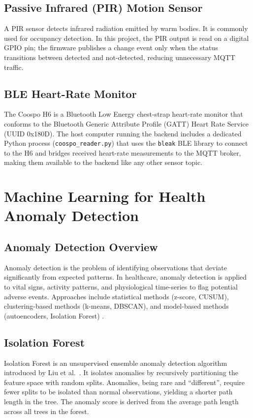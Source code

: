 \subsection{Passive Infrared (PIR) Motion Sensor}

A PIR sensor detects infrared radiation emitted by warm bodies. It is commonly used for occupancy detection. In this project, the PIR output is read on a digital GPIO pin; the firmware publishes a change event only when the status transitions between detected and not-detected, reducing unnecessary MQTT traffic.

\subsection{BLE Heart-Rate Monitor}

The Coospo H6 is a Bluetooth Low Energy chest-strap heart-rate monitor that conforms to the Bluetooth Generic Attribute Profile (GATT) Heart Rate Service (UUID 0x180D). The host computer running the backend includes a dedicated Python process (\texttt{coospo\_reader.py}) that uses the \texttt{bleak} BLE library to connect to the H6 and bridges received heart-rate measurements to the MQTT broker, making them available to the backend like any other sensor topic.

\section{Machine Learning for Health Anomaly Detection}

\subsection{Anomaly Detection Overview}

Anomaly detection is the problem of identifying observations that deviate significantly from expected patterns. In healthcare, anomaly detection is applied to vital signs, activity patterns, and physiological time-series to flag potential adverse events. Approaches include statistical methods (z-score, CUSUM), clustering-based methods (k-means, DBSCAN), and model-based methods (autoencoders, Isolation Forest) \cite{Chandola2009}.

\subsection{Isolation Forest}

Isolation Forest is an unsupervised ensemble anomaly detection algorithm introduced by Liu et al.\ \cite{Liu2008}. It isolates anomalies by recursively partitioning the feature space with random splits. Anomalies, being rare and ``different'', require fewer splits to be isolated than normal observations, yielding a shorter path length in the tree. The anomaly score is derived from the average path length across all trees in the forest.


